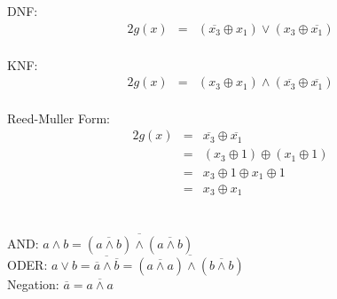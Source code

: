 \documentclass[10pt,a4paper,oneside,ngerman,numbers=noenddot]{scrartcl}
\begin{document}
\subsection{} %
DNF:\\
\begin{alignat*}{2}
g(x) &=& (\overline{x_{3}} \oplus x_{1}) \vee (x_{3} \oplus \overline{x_{1}})
\end{alignat*}\\
KNF:\\
\begin{alignat*}{2}
g(x) &=& (x_{3} \oplus x_{1}) \wedge (\overline{x_{3}} \oplus \overline{x_{1}})
\end{alignat*}\\
Reed-Muller Form:\\
\begin{alignat*}{2}
g(x) &=& \overline{x_{3}} \oplus \overline{x_{1}} \\
&=& (x_{3} \oplus 1) \oplus (x_{1} \oplus 1) \\
&=& x_{3} \oplus 1 \oplus x_{1} \oplus 1 \\
&=& x_{3} \oplus x_{1}
\end{alignat*}
\section{} %
\subsection{} %
AND: $a \wedge b = \overline{(\overline{a \wedge b}) \wedge (\overline{a \wedge b})}$\\
ODER: $a \vee b = \overline{\overline{a} \wedge \overline{b}} = \overline{(\overline{a \wedge a}) \wedge (\overline{b \wedge b})}$\\
Negation: $\overline{a} = \overline{a \wedge a}$\\
\end{document}
